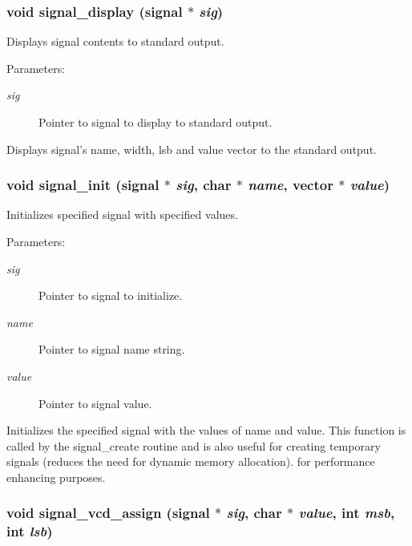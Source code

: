 \subsubsection{\setlength{\rightskip}{0pt plus 5cm}void signal\_\-display ({\bf signal} $\ast$ {\em sig})}\label{signal_8c_a9}


Displays signal contents to standard output.

\begin{Desc}
\item[Parameters:]
\begin{description}
\item[{\em sig}]Pointer to signal to display to standard output.\end{description}
\end{Desc}
Displays signal's name, width, lsb and value vector to the standard output. 
\subsubsection{\setlength{\rightskip}{0pt plus 5cm}void signal\_\-init ({\bf signal} $\ast$ {\em sig}, char $\ast$ {\em name}, {\bf vector} $\ast$ {\em value})}\label{signal_8c_a2}


Initializes specified signal with specified values.

\begin{Desc}
\item[Parameters:]
\begin{description}
\item[{\em sig}]Pointer to signal to initialize. \item[{\em name}]Pointer to signal name string. \item[{\em value}]Pointer to signal value.\end{description}
\end{Desc}
Initializes the specified signal with the values of name and value. This function is called by the signal\_\-create routine and is also useful for creating temporary signals (reduces the need for dynamic memory allocation). for performance enhancing purposes. 
\subsubsection{\setlength{\rightskip}{0pt plus 5cm}void signal\_\-vcd\_\-assign ({\bf signal} $\ast$ {\em sig}, char $\ast$ {\em value}, int {\em msb}, int {\em lsb})}\label{signal_8c_a7}


